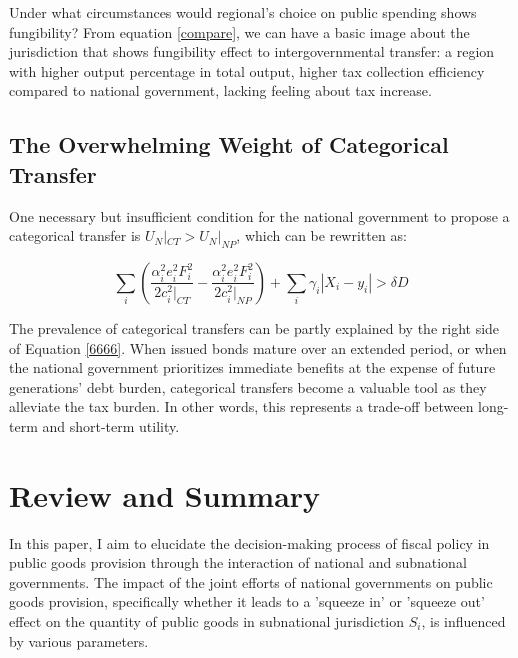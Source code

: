 Under what circumstances would regional's choice on public spending shows fungibility? From equation \ref*{compare}, we can have a basic image about the jurisdiction that shows fungibility effect to intergovernmental transfer: a region with higher output percentage in total output, higher tax collection efficiency compared to national government, lacking feeling about tax increase.
\subsection{The Overwhelming Weight of Categorical Transfer}

One necessary but insufficient condition for the national government to propose a categorical transfer is $U_N|_{CT} > U_N|_{NP}$, which can be rewritten as:

\begin{equation}
    \sum_i(\frac{\alpha_i^2e_i^2F_i^2}{2c_i^2|_{CT}}-\frac{\alpha_i^2e_i^2F_i^2}{2c_i^2|_{NP}}) +\sum_i\gamma_i|X_i-y_i|>\delta D \label{6666}
\end{equation}

The prevalence of categorical transfers can be partly explained by the right side of Equation \ref{6666}. When issued bonds mature over an extended period, or when the national government prioritizes immediate benefits at the expense of future generations' debt burden, categorical transfers become a valuable tool as they alleviate the tax burden. In other words, this represents a trade-off between long-term and short-term utility.

\section{Review and Summary}

In this paper, I aim to elucidate the decision-making process of fiscal policy in public goods provision through the interaction of national and subnational governments. The impact of the joint efforts of national governments on public goods provision, specifically whether it leads to a 'squeeze in' or 'squeeze out' effect on the quantity of public goods in subnational jurisdiction $S_i$, is influenced by various parameters. %

